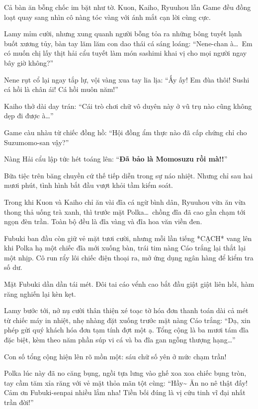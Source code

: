 \documentclass[../main.tex]{subfiles}
\begin{document}
Cả bàn ăn bỗng chốc im bặt như tờ. Kuon, Kaiho, Ryuuhou lẫn Game đều đồng loạt quay sang nhìn cô nàng tóc vàng với ánh mắt cạn lời cùng cực.

Lamy mỉm cười, nhưng xung quanh người bỗng tỏa ra những bông tuyết lạnh buốt xương tủy, bàn tay lăm lăm con dao thái cá sáng loáng: ``Nene-chan à\dots\ Em có muốn chị lấy thịt hải cẩu tuyết làm món sashimi khai vị cho mọi người ngay bây giờ không?''

Nene rụt cổ lại ngay tắp lự, vội vàng xua tay lia lịa: ``Ấy ấy! Em đùa thôi! Sushi cá hồi là chân ái! Cá hồi muôn năm!''

Kaiho thở dài day trán: ``Cái trò chơi chữ vô duyên này ở vũ trụ nào cũng không dẹp đi được à\dots''

Game càu nhàu từ chiếc đồng hồ: ``Hội đồng ẩm thực nào đã cấp chứng chỉ cho Suzumomo-san vậy?''

Nàng Hải cẩu lập tức hét toáng lên: ``\textbf{Đã bảo là Momosuzu rồi mà!!}''

\ct

Bữa tiệc trên băng chuyền cứ thế tiếp diễn trong sự náo nhiệt. Nhưng chỉ sau hai mươi phút, tình hình bắt đầu vượt khỏi tầm kiểm soát.

Trong khi Kuon và Kaiho chỉ ăn vài đĩa cá ngừ bình dân, Ryuuhou vừa ăn vừa thong thả uống trà xanh, thì trước mặt Polka\dots\ chồng đĩa đã cao gần chạm tới ngọn đèn trần. Toàn bộ đều là đĩa vàng và đĩa hoa văn viền đen.

Fubuki ban đầu còn giữ vẻ mặt tươi cười, nhưng mỗi lần tiếng *CẠCH* vang lên khi Polka hạ một chiếc đĩa mới xuống bàn, trái tim nàng Cáo trắng lại thắt lại một nhịp. Cô run rẩy lôi chiếc điện thoại ra, mở ứng dụng ngân hàng để kiểm tra số dư.

Mặt Fubuki dần dần tái mét. Đôi tai cáo vểnh cao bắt đầu giật giật liên hồi, hàm răng nghiến lại kèn kẹt.

Lamy bước tới, nở nụ cười thân thiện xé toạc tờ hóa đơn thanh toán dài cả mét từ chiếc máy in nhiệt, nhẹ nhàng đặt xuống trước mặt nàng Cáo trắng: ``Dạ, xin phép gửi quý khách hóa đơn tạm tính đợt một ạ. Tổng cộng là ba mươi tám đĩa đặc biệt, kèm theo năm phần súp vi cá và ba đĩa gan ngỗng thượng hạng\dots''

Con số tổng cộng hiện lên rõ mồn một: sáu chữ số yên ở mức chạm trần!

Polka lúc này đã no căng bụng, ngồi tựa lưng vào ghế xoa xoa chiếc bụng tròn, tay cầm tăm xỉa răng với vẻ mặt thỏa mãn tột cùng: ``Hầy\~{} Ăn no nê thật đấy! Cảm ơn Fubuki-senpai nhiều lắm nha! Tiền bối đúng là vị cứu tinh vĩ đại nhất trần đời!''
\end{document}
